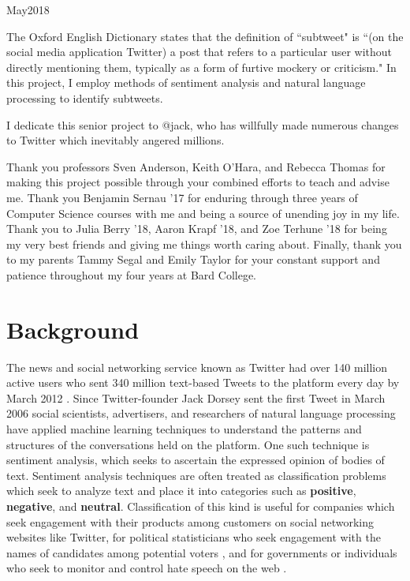 \documentclass[11pt, twoside, reqno]{book}
\begin{document}
    {May}{2018}

\abstr

The Oxford English Dictionary states that the definition of ``subtweet" is ``(on the social media application Twitter) a post that refers to a particular user without directly mentioning them, typically as a form of furtive mockery or criticism." In this project, I employ methods of sentiment analysis and natural language processing to identify subtweets.

\tableofcontents

\dedic

I dedicate this senior project to @jack, who has willfully made numerous changes to Twitter which inevitably angered millions.

\acknowl

Thank you professors Sven Anderson, Keith O'Hara, and Rebecca Thomas for making this project possible through your combined efforts to teach and advise me. Thank you Benjamin Sernau '17 for enduring through three years of Computer Science courses with me and being a source of unending joy in my life. Thank you to Julia Berry '18, Aaron Krapf '18, and Zoe Terhune '18 for being my very best friends and giving me things worth caring about. Finally, thank you to my parents Tammy Segal and Emily Taylor for your constant support and patience throughout my four years at Bard College. 

\startmain


\intro

\section{Background}
\label{secI1}

The news and social networking service known as Twitter had over 140 million active users who sent 340 million text-based Tweets to the platform every day by March 2012 \cite{TWITTER}. Since Twitter-founder Jack Dorsey sent the first Tweet in March 2006 \cite{JACK} social scientists, advertisers, and researchers of natural language processing have applied machine learning techniques to understand the patterns and structures of the conversations held on the platform. One such technique is sentiment analysis, which seeks to ascertain the expressed opinion of bodies of text. Sentiment analysis techniques are often treated as classification problems which seek to analyze text and place it into categories such as \textbf{positive}, \textbf{negative}, and \textbf{neutral}. Classification of this kind is useful for companies which seek engagement with their products among customers \cite{IBM} on social networking websites like Twitter, for political statisticians who seek engagement with the names of candidates among potential voters \cite{POLITICS}, and for governments or individuals who seek to monitor and control hate speech on the web \cite{HATE}. 
\end{document}
